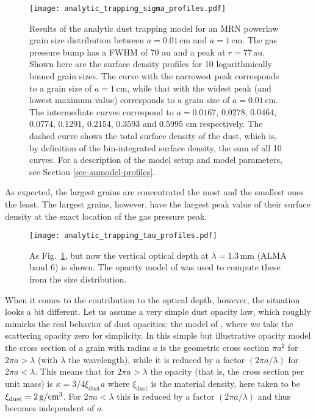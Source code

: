 \documentclass{aa}
\def\cm{\hbox{cm}}
\begin{document}
\begin{figure}
\centerline{\texttt{[image: analytic\_trapping\_sigma\_profiles.pdf]}}
\caption{\label{fig-anmodel-distribution-sigma}Results of the analytic dust
  trapping model for an MRN powerlaw grain size distribution between
  $a=0.01\,\mathrm{cm}$ and $a=1\,\mathrm{cm}$. The gas pressure bump has a FWHM
  of 70 au and a peak at $r=77\,\mathrm{au}$. Shown here are the surface density
  profiles for 10 logarithmically binned grain sizes. The curve with the
  narrowest peak corresponds to a grain size of $a=1\,\mathrm{cm}$, while that
  with the widest peak (and lowest maximum value) corresponds to a grain size of
  $a=0.01\,\mathrm{cm}$. The intermediate curves correspond to $a=0.0167$,
  0.0278, 0.0464, 0.0774, 0.1291, 0.2154, 0.3593 and 0.5995 $\mathrm{cm}$
  respectively. The dashed curve shows the total surface density of the dust,
  which is, by definition of the bin-integrated surface density, the sum of all
  10 curves. For a description of the model setup and model parameters, see
  Section \ref{sec-anmodel-profiles}.}
\end{figure}

As expected, the largest grains are concentrated the most and the smallest ones
the least. The largest grains, however, have the largest peak value of their
surface density at the exact location of the gas pressure peak.

\begin{figure}
\centerline{\texttt{[image: analytic\_trapping\_tau\_profiles.pdf]}}
\caption{\label{fig-anmodel-distribution-tau}As Fig.~\ref{fig-anmodel-distribution-sigma},
  but now the vertical optical depth at $\lambda=1.3\,\mathrm{mm}$ (ALMA band 6)
  is shown. The opacity model of \citet{1997MNRAS.291..121I} was used to compute these
from the size distribution.} 
\end{figure}

When it comes to the contribution to the optical depth, however, the situation
looks a bit different. Let us assume a very simple dust opacity law, which
roughly mimicks the real behavior of dust opacities: the model of
\citet{1997MNRAS.291..121I}, where we take the scattering opacity zero for
simplicity. In this simple but illustrative opacity model the cross
section of a grain with radius $a$ is the geometric cross section $\pi a^2$
for $2\pi a>\lambda$ (with $\lambda$ the wavelength), while it is reduced by
a factor $(2\pi a/\lambda)$ for $2\pi a<\lambda$. This means that for
$2\pi a>\lambda$ the opacity (that is, the cross section per unit mass)
is $\kappa=3/4\xi_{\mathrm{dust}} a$ where $\xi_{\mathrm{dust}}$ is the material
density, here taken to be $\xi_{\mathrm{dust}}=2\,\mathrm{g}/\cm^3$. For
$2\pi a<\lambda$ this is reduced by a factor $(2\pi a/\lambda)$ and
thus becomes independent of $a$.
\end{document}
